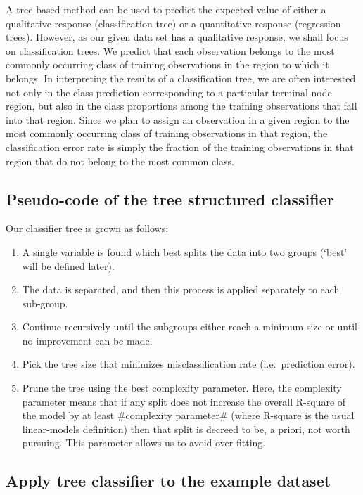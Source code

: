 \documentclass[]{article}
\begin{document}
A tree based method can be used to predict the expected value of either
a qualitative response (classification tree) or a quantitative response
(regression trees). However, as our given data set has a qualitative
response, we shall focus on classification trees. We predict that each
observation belongs to the most commonly occurring class of training
observations in the region to which it belongs. In interpreting the
results of a classification tree, we are often interested not only in
the class prediction corresponding to a particular terminal node region,
but also in the class proportions among the training observations that
fall into that region. Since we plan to assign an observation in a given
region to the most commonly occurring class of training observations in
that region, the classification error rate is simply the fraction of the
training observations in that region that do not belong to the most
common class.

\subsection{Pseudo-code of the tree structured
classifier}\label{pseudo-code-of-the-tree-structured-classifier}

Our classifier tree is grown as follows:

\begin{enumerate}
\def\labelenumi{\arabic{enumi}.}
\item
  A single variable is found which best splits the data into two groups
  (`best' will be defined later).
\item
  The data is separated, and then this process is applied separately to
  each sub-group.
\item
  Continue recursively until the subgroups either reach a minimum size
  or until no improvement can be made.
\item
  Pick the tree size that minimizes misclassification rate
  (i.e.~prediction error).
\item
  Prune the tree using the best complexity parameter. Here, the
  complexity parameter means that if any split does not increase the
  overall R-square of the model by at least \#complexity parameter\#
  (where R-square is the usual linear-models definition) then that split
  is decreed to be, a priori, not worth pursuing. This parameter allows
  us to avoid over-fitting.
\end{enumerate}

\subsection{Apply tree classifier to the example
dataset}\label{apply-tree-classifier-to-the-example-dataset}
\end{document}
